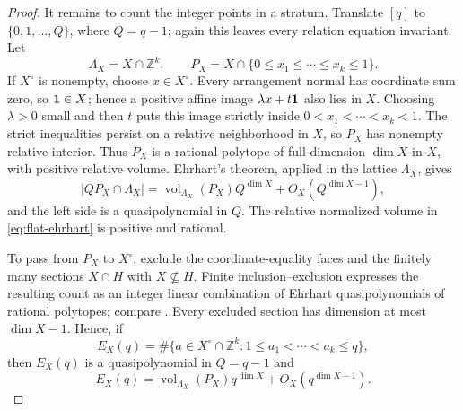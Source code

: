 \documentclass[11pt,reqno]{amsart}
\theoremstyle{definition}
\theoremstyle{remark}
\begin{document}
\begin{proof}
It remains to count the integer points in a stratum.  Translate $[q]$ to
$\{0,1,\ldots,Q\}$, where $Q=q-1$; again this leaves every relation
equation invariant.  Let
\[
 \Lambda_X=X\cap\mathbb Z^k,
 \qquad
 P_X=X\cap\{0\leq x_1\leq\cdots\leq x_k\leq1\}.
\]
If $X^\circ$ is nonempty, choose $x\in X^\circ$.  Every arrangement normal
has coordinate sum zero, so ${\bf1}\in X$; hence a positive affine image
$\lambda x+t{\bf1}$ also lies in $X$.  Choosing $\lambda>0$ small and then
$t$ puts this image strictly inside
$0<x_1<\cdots<x_k<1$.  The strict inequalities persist on a relative
neighborhood in $X$, so $P_X$ has nonempty relative interior.  Thus $P_X$
is a rational polytope of full dimension $\dim X$ in $X$, with positive
relative volume.  Ehrhart's
theorem, applied in the lattice $\Lambda_X$, gives
\begin{equation}\label{eq:flat-ehrhart}
 |QP_X\cap\Lambda_X|
 =\operatorname{vol}_{\Lambda_X}(P_X)Q^{\dim X}
   +O_X(Q^{\dim X-1}),
\end{equation}
and the left side is a quasipolynomial in $Q$.  The relative normalized
volume in \eqref{eq:flat-ehrhart} is positive and rational.

To pass from $P_X$ to $X^\circ$, exclude the coordinate-equality faces and
the finitely many sections $X\cap H$ with $X\not\subseteq H$.  Finite
inclusion--exclusion expresses the resulting count as an integer linear
combination of Ehrhart quasipolynomials of rational polytopes; compare
\cite[Theorems~4.1--4.2 and Corollary~4.3]{BeckZaslavsky2006}.  Every
excluded section has
dimension at most $\dim X-1$.  Hence, if
\[
 E_X(q)=\#\{a\in X^\circ\cap\mathbb Z^k:
                    1\leq a_1<\cdots<a_k\leq q\},
\]
then $E_X(q)$ is a quasipolynomial in $Q=q-1$ and
\begin{equation}\label{eq:stratum-ehrhart}
 E_X(q)=\operatorname{vol}_{\Lambda_X}(P_X)q^{\dim X}
          +O_X(q^{\dim X-1}).
\end{equation}


\end{proof}
\end{document}
